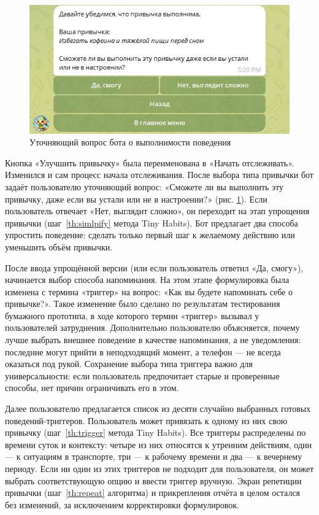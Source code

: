 \documentclass[pdflatex,sn-mathphys-num]{sn-jnl}%
\theoremstyle{thmstyleone}%
\theoremstyle{thmstyletwo}%
\theoremstyle{thmstylethree}%
\begin{document}
\begin{figure}
    \centering
    \includegraphics[width=0.6\linewidth]{figures/Bot/bot_simplify.png}
    \caption{Уточняющий вопрос бота о выполнимости поведения}
    \label{fig:bot_simplify}
\end{figure}

Кнопка «Улучшить привычку» была переименована в «Начать отслеживать». Изменился и сам процесс начала отслеживания. После выбора типа привычки бот задаёт пользователю уточняющий вопрос: «Сможете ли вы выполнить эту привычку, даже если вы устали или не в настроении?» (рис. \ref{fig:bot_simplify}). Если пользователь отвечает «Нет, выглядит сложно», он переходит на этап упрощения привычки (шаг~\ref{th:simlpify} метода Tiny Habits). Бот предлагает два способа упростить поведение: сделать только первый шаг к желаемому действию или уменьшить объём привычки. 

После ввода упрощённой версии (или если пользователь ответил «Да, смогу»), начинается выбор способа напоминания. На этом этапе формулировка была изменена с термина «триггер» на вопрос: «Как вы будете напоминать себе о привычке?». Такое изменение было сделано по результатам тестирования бумажного прототипа, в ходе которого термин «триггер» вызывал у пользователей затруднения. Дополнительно пользователю объясняется, почему лучше выбрать внешнее поведение в качестве напоминания, а не уведомления: последние могут прийти в неподходящий момент, а телефон — не всегда оказаться под рукой. Сохранение выбора типа триггера важно для универсальности: если пользователь предпочитает старые и проверенные способы, нет причин ограничивать его в этом. 

Далее пользователю предлагается список из десяти случайно выбранных готовых поведений-триггеров. Пользователь может привязать к одному из них свою привычку (шаг~\ref{th:trigger} метода Tiny Habits). Все триггеры распределены по времени суток и контексту: четыре из них относятся к утренним действиям, один — к ситуациям в транспорте, три — к рабочему времени и два — к вечернему периоду. Если ни один из этих триггеров не подходит для пользователя, он может выбрать соответствующую опцию и ввести триггер вручную. Экран репетиции привычки (шаг~\ref{th:repeat} алгоритма) и прикрепления отчёта в целом остался без изменений, за исключением корректировки формулировок.
\end{document}
